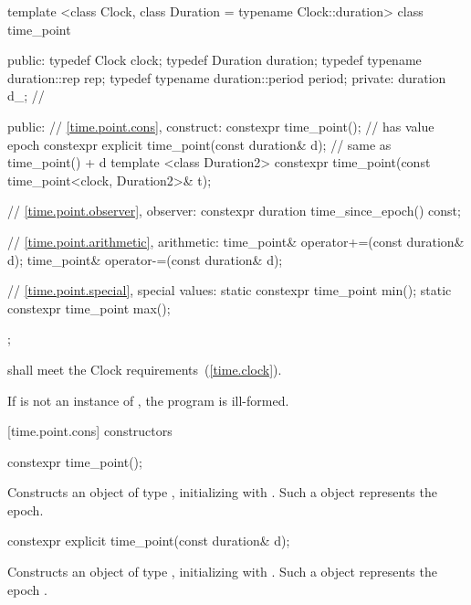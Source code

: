\begin{codeblock}
template <class Clock, class Duration = typename Clock::duration>
class time_point {
public:
  typedef Clock                     clock;
  typedef Duration                  duration;
  typedef typename duration::rep    rep;
  typedef typename duration::period period;
private:
  duration d_;  // \expos

public:
  // \ref{time.point.cons}, construct:
  constexpr time_point();  // has value epoch
  constexpr explicit time_point(const duration& d);  // same as time_point() + d
  template <class Duration2>
    constexpr time_point(const time_point<clock, Duration2>& t);

  // \ref{time.point.observer}, observer:
  constexpr duration time_since_epoch() const;

  // \ref{time.point.arithmetic}, arithmetic:
  time_point& operator+=(const duration& d);
  time_point& operator-=(const duration& d);

  // \ref{time.point.special}, special values:
  static constexpr time_point min();
  static constexpr time_point max();
};
\end{codeblock}

\pnum
{} shall meet the Clock requirements~(\ref{time.clock}).

\pnum
If  is not an instance of ,
the program is ill-formed.

[time.point.cons]{ constructors}

%
\begin{itemdecl}
constexpr time_point();
\end{itemdecl}

\begin{itemdescr}
\pnum
\effects Constructs an object of type , initializing
 with . Such a  object
represents the epoch.
\end{itemdescr}

%
\begin{itemdecl}
constexpr explicit time_point(const duration& d);
\end{itemdecl}

\begin{itemdescr}
\pnum
\effects Constructs an object of type , initializing
 with . Such a  object represents the epoch
.
\end{itemdescr}

